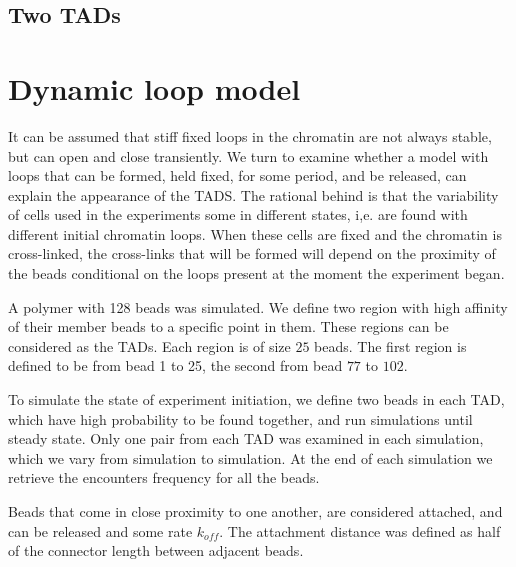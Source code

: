 \documentclass[12pt]{book}
\begin{document}
\subsection{Two TADs}

\section{Dynamic loop model}\label{section_dynamicLoopModel}
It can be assumed that stiff fixed loops in the chromatin are not always stable, but can open and close transiently. We turn to examine whether a model with loops that can be formed, held fixed, for some period, and be released, can explain the appearance of the TADS. The rational behind is that the variability of cells used in the experiments some in different states, i,e. are found with different initial chromatin loops. When these cells are fixed and the chromatin is cross-linked, the cross-links that will be formed will depend on the proximity of the beads conditional on the loops present at the moment the experiment began. 


A polymer with 128 beads was simulated. We define two region with high affinity of their member beads to a specific point in them. These regions can be considered as the TADs. Each region is of size $25$ beads. The first region is defined to be from bead 1 to 25, the second from bead $77$ to $102$. 

To simulate the state of experiment initiation, we define two beads in each TAD, which have high probability to be found together, and run simulations until steady state. Only one pair from each TAD was examined in each simulation, which we vary from simulation to simulation. At the end of each simulation we retrieve the encounters frequency for all the beads. 

Beads that come in close proximity to one another, are considered attached, and can be released and some rate $k_{off}$. The attachment distance was defined as half of the connector length between adjacent beads. 
\end{document}
